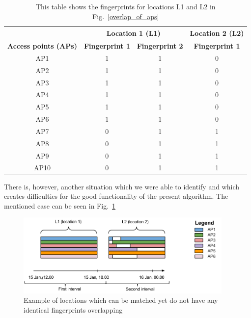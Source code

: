\begin{table}[h]
\begin{tabular}{|c|c|c|c|}
\hline
\multicolumn{1}{|l|}{}       & \multicolumn{2}{c|}{\textbf{Location 1 (L1)}}   & \textbf{Location 2 (L2)} \\ \hline
\textbf{Access points (APs)} & \textbf{Fingerprint 1} & \textbf{Fingerprint 2} & \textbf{Fingerprint 1}   \\ \hline
AP1                          & 1                      & 1                      & 0                        \\
AP2                          & 1                      & 1                      & 0                        \\
AP3                          & 1                      & 1                      & 0                        \\
AP4                          & 1                      & 1                      & 0                        \\
AP5                          & 1                      & 1                      & 0                        \\
AP6                          & 1                      & 1                      & 0                        \\
AP7                          & 0                      & 1                      & 1                        \\
AP8                          & 0                      & 1                      & 1                        \\
AP9                          & 0                      & 1                      & 1                        \\
AP10                         & 0                      & 1                      & 1                        \\ \hline
\end{tabular}
\caption{This table shows the fingerprints for locations L1 and L2 in
Fig.~\ref{overlap_of_aps}}
\label{tab:table_fingerprints}
\end{table}

There is, however, another situation which we were able to identify and which
creates difficulties for the good functionality of the present algorithm. The
mentioned case can be seen in Fig.~\ref{diff_fp_same_loc}

\begin{figure}[!h]
\centering
\includegraphics[width=0.95\textwidth]{figures/matching/different_fp_same_loc.png}
\caption{Example of locations which can be matched yet do not have any identical
fingerprints overlapping}
\label{diff_fp_same_loc}
\end{figure}

